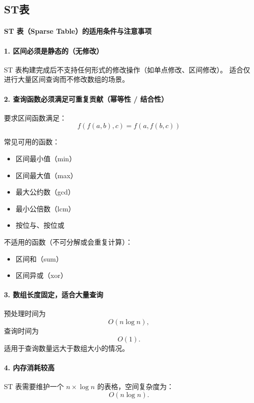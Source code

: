 \begin{itemize}
\begin{lstlisting}[language=C++]
\end{lstlisting}
\subsection{ST表}
\paragraph*{ST 表（Sparse Table）的适用条件与注意事项}

\paragraph*{1. 区间必须是静态的（无修改）}
ST 表构建完成后不支持任何形式的修改操作（如单点修改、区间修改）。  
适合仅进行大量区间查询而不修改数组的场景。

\paragraph*{2. 查询函数必须满足可重复贡献（幂等性 / 结合性）}
要求区间函数满足：
\[
f(f(a,b),c) = f(a,f(b,c))
\]

常见可用的函数：
\begin{itemize}
	\item 区间最小值（min）
	\item 区间最大值（max）
	\item 最大公约数（gcd）
	\item 最小公倍数（lcm）
	\item 按位与、按位或
\end{itemize}

不适用的函数（不可分解或会重复计算）：
\begin{itemize}
	\item 区间和（sum）
	\item 区间异或（xor）
\end{itemize}

\paragraph*{3. 数组长度固定，适合大量查询}
预处理时间为
\[
O(n \log n),
\]
查询时间为
\[
O(1).
\]
适用于查询数量远大于数组大小的情况。

\paragraph*{4. 内存消耗较高}
ST 表需要维护一个 $n \times \log n$ 的表格，空间复杂度为：
\[
O(n \log n).
\]


\end{itemize}
